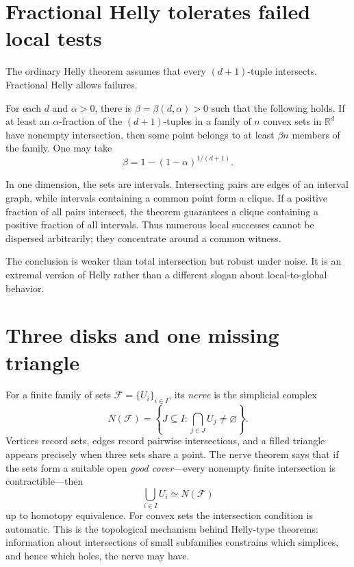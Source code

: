 \section{Fractional Helly tolerates failed local tests}

The ordinary Helly theorem assumes that every \((d+1)\)-tuple intersects.  Fractional Helly allows failures.

For each \(d\) and \(\alpha>0\), there is \(\beta=\beta(d,\alpha)>0\) such that the following holds.  If at least an \(\alpha\)-fraction of the \((d+1)\)-tuples in a family of \(n\) convex sets in \(\mathbb R^d\) have nonempty intersection, then some point belongs to at least \(\beta n\) members of the family.  One may take
\[
  \beta
  =1-(1-\alpha)^{1/(d+1)}.
\]

In one dimension, the sets are intervals.  Intersecting pairs are edges of an interval graph, while intervals containing a common point form a clique.  If a positive fraction of all pairs intersect, the theorem guarantees a clique containing a positive fraction of all intervals.  Thus numerous local successes cannot be dispersed arbitrarily; they concentrate around a common witness.

The conclusion is weaker than total intersection but robust under noise.  It is an extremal version of Helly rather than a different slogan about local-to-global behavior.

\section{Three disks and one missing triangle}

For a finite family of sets $\mathcal F=\{U_i\}_{i\in I}$, its \emph{nerve} is the simplicial complex
\[
 N(\mathcal F)=
 \left\{J\subseteq I:\bigcap_{j\in J}U_j\ne\varnothing\right\}.
\]
Vertices record sets, edges record pairwise intersections, and a filled triangle appears precisely when three sets share a point. The nerve theorem says that if the sets form a suitable open \emph{good cover}---every nonempty finite intersection is contractible---then
\[
 \boxed{\bigcup_{i\in I}U_i\simeq N(\mathcal F)}
\]
up to homotopy equivalence. For convex sets the intersection condition is automatic. This is the topological mechanism behind Helly-type theorems: information about intersections of small subfamilies constrains which simplices, and hence which holes, the nerve may have.


